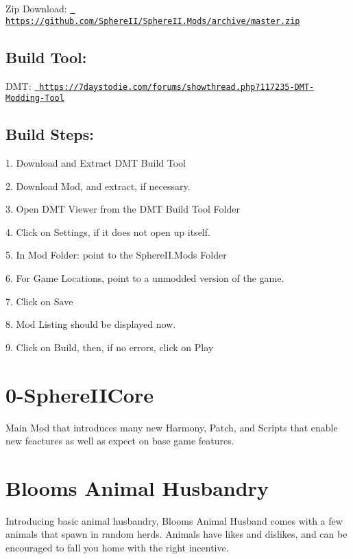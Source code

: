 Zip Download\+: \href{https://github.com/SphereII/SphereII.Mods/archive/master.zip}{\texttt{ https\+://github.\+com/\+Sphere\+I\+I/\+Sphere\+I\+I.\+Mods/archive/master.\+zip}}\hypertarget{index_autotoc_md11}{}\subsection{Build Tool\+:}\label{index_autotoc_md11}
D\+MT\+: \href{https://7daystodie.com/forums/showthread.php?117235-DMT-Modding-Tool}{\texttt{ https\+://7daystodie.\+com/forums/showthread.\+php?117235-\/\+D\+M\+T-\/\+Modding-\/\+Tool}}\hypertarget{index_autotoc_md12}{}\subsection{Build Steps\+:}\label{index_autotoc_md12}
\begin{DoxyVerb}1. Download and Extract DMT Build Tool

2. Download Mod, and extract, if necessary.

3. Open DMT Viewer from the DMT Build Tool Folder

4. Click on Settings, if it does not open up itself.

5. In Mod Folder:  point to the SphereII.Mods Folder

6. For Game Locations, point to a unmodded version of the game.

7. Click on Save

8. Mod Listing should be displayed now. 

9. Click on Build, then, if no errors, click on Play
\end{DoxyVerb}








 \hypertarget{index_autotoc_md14}{}\section{0-\/\+Sphere\+I\+I\+Core}\label{index_autotoc_md14}
Main Mod that introduces many new Harmony, Patch, and Scripts that enable new feactures as well as expect on base game features.



 \hypertarget{index_autotoc_md16}{}\section{Bloom\textquotesingle{}s Animal Husbandry}\label{index_autotoc_md16}
Introducing basic animal husbandry, Bloom\textquotesingle{}s Animal Husband comes with a few animals that spawn in random herds. Animals have likes and dislikes, and can be encouraged to fall you home with the right incentive.



